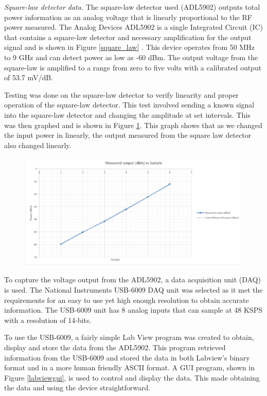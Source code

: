 \emph{Square-law detector data.}  The square-law detector used (ADL5902) outputs total power information as an analog voltage that is linearly proportional to the RF power measured.  The Analog Devices ADL5902 is a single Integrated Circuit (IC) that contains a square-law detector and necessary amplification for the output signal and is shown in Figure \ref{square_law} .  This device operates from 50 MHz to 9 GHz and can detect power as low as -60 dBm.  The output voltage from the square-law is amplified to a range from zero to five volts with a calibrated output of 53.7 mV/dB.  

Testing was done on the square-law detector to verify linearity and proper operation of the square-law detector.  This test involved sending a known signal into the square-law detector and changing the amplitude at set intervals.  This was then graphed and is shown in Figure \ref{square_law_linear}.  This graph shows that as we changed the input power in linearly, the output measured from the square law detector also changed linearly.

{\begin{figure}[h!tb] \centering
\includegraphics[width=\textwidth]{Images/square_law_linear1.pdf}
\label{square_law_linear}
\end{figure}
}

To capture the voltage output from the ADL5902, a data acquisition unit (DAQ) is used.  The National Instruments USB-6009 DAQ unit was selected as it met the requirements for an easy to use yet high enough resolution to obtain accurate information.  The USB-6009 unit has 8 analog inputs that can sample at 48 KSPS with a resolution of 14-bits.  

To use the USB-6009, a fairly simple Lab View program was created to obtain, display and store the data from the ADL5902.  This program retrieved information from the USB-6009 and stored the data in both Labview's binary format and in a more human friendly ASCII format.  A GUI program, shown in Figure \ref{labviewgui}, is used to control and display the data.  This made obtaining the data and using the device straightforward.

